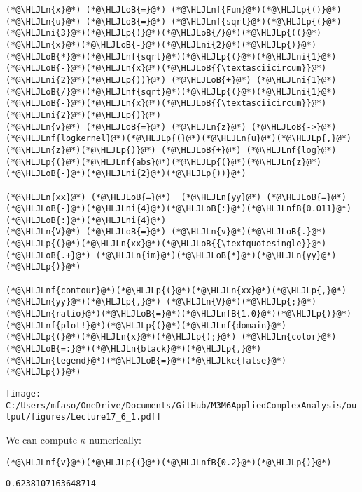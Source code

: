 \documentclass[12pt,landscape]{article}
\newcommand{\HLJLkc}[1]{\textcolor[RGB]{59,151,46}{\textit{#1}}}
\newcommand{\HLJLn}[1]{#1}
\newcommand{\HLJLnf}[1]{\textcolor[RGB]{66,102,213}{#1}}
\newcommand{\HLJLnfB}[1]{\textcolor[RGB]{59,151,46}{#1}}
\newcommand{\HLJLni}[1]{\textcolor[RGB]{59,151,46}{#1}}
\newcommand{\HLJLoB}[1]{\textcolor[RGB]{102,102,102}{\textbf{#1}}}
\newcommand{\HLJLp}[1]{#1}
\def\cent#1{\begin{center}#1\end{center} }
\begin{document}
{\begin{lstlisting}
(*@\HLJLn{x}@*) (*@\HLJLoB{=}@*) (*@\HLJLnf{Fun}@*)(*@\HLJLp{()}@*)
(*@\HLJLn{u}@*) (*@\HLJLoB{=}@*) (*@\HLJLnf{sqrt}@*)(*@\HLJLp{(}@*)(*@\HLJLni{3}@*)(*@\HLJLp{)}@*)(*@\HLJLoB{/}@*)(*@\HLJLp{((}@*)(*@\HLJLn{x}@*)(*@\HLJLoB{-}@*)(*@\HLJLni{2}@*)(*@\HLJLp{)}@*)(*@\HLJLoB{*}@*)(*@\HLJLnf{sqrt}@*)(*@\HLJLp{(}@*)(*@\HLJLni{1}@*)(*@\HLJLoB{-}@*)(*@\HLJLn{x}@*)(*@\HLJLoB{{\textasciicircum}}@*)(*@\HLJLni{2}@*)(*@\HLJLp{))}@*) (*@\HLJLoB{+}@*) (*@\HLJLni{1}@*)(*@\HLJLoB{/}@*)(*@\HLJLnf{sqrt}@*)(*@\HLJLp{(}@*)(*@\HLJLni{1}@*)(*@\HLJLoB{-}@*)(*@\HLJLn{x}@*)(*@\HLJLoB{{\textasciicircum}}@*)(*@\HLJLni{2}@*)(*@\HLJLp{)}@*)
(*@\HLJLn{v}@*) (*@\HLJLoB{=}@*) (*@\HLJLn{z}@*) (*@\HLJLoB{->}@*) (*@\HLJLnf{logkernel}@*)(*@\HLJLp{(}@*)(*@\HLJLn{u}@*)(*@\HLJLp{,}@*) (*@\HLJLn{z}@*)(*@\HLJLp{)}@*) (*@\HLJLoB{+}@*) (*@\HLJLnf{log}@*)(*@\HLJLp{(}@*)(*@\HLJLnf{abs}@*)(*@\HLJLp{(}@*)(*@\HLJLn{z}@*)(*@\HLJLoB{-}@*)(*@\HLJLni{2}@*)(*@\HLJLp{))}@*)

(*@\HLJLn{xx}@*) (*@\HLJLoB{=}@*)  (*@\HLJLn{yy}@*) (*@\HLJLoB{=}@*) (*@\HLJLoB{-}@*)(*@\HLJLni{4}@*)(*@\HLJLoB{:}@*)(*@\HLJLnfB{0.011}@*)(*@\HLJLoB{:}@*)(*@\HLJLni{4}@*)
(*@\HLJLn{V}@*) (*@\HLJLoB{=}@*) (*@\HLJLn{v}@*)(*@\HLJLoB{.}@*)(*@\HLJLp{(}@*)(*@\HLJLn{xx}@*)(*@\HLJLoB{{\textquotesingle}}@*) (*@\HLJLoB{.+}@*) (*@\HLJLn{im}@*)(*@\HLJLoB{*}@*)(*@\HLJLn{yy}@*)(*@\HLJLp{)}@*)

(*@\HLJLnf{contour}@*)(*@\HLJLp{(}@*)(*@\HLJLn{xx}@*)(*@\HLJLp{,}@*) (*@\HLJLn{yy}@*)(*@\HLJLp{,}@*) (*@\HLJLn{V}@*)(*@\HLJLp{;}@*)(*@\HLJLn{ratio}@*)(*@\HLJLoB{=}@*)(*@\HLJLnfB{1.0}@*)(*@\HLJLp{)}@*)
(*@\HLJLnf{plot!}@*)(*@\HLJLp{(}@*)(*@\HLJLnf{domain}@*)(*@\HLJLp{(}@*)(*@\HLJLn{x}@*)(*@\HLJLp{);}@*) (*@\HLJLn{color}@*)(*@\HLJLoB{=:}@*)(*@\HLJLn{black}@*)(*@\HLJLp{,}@*) (*@\HLJLn{legend}@*)(*@\HLJLoB{=}@*)(*@\HLJLkc{false}@*)(*@\HLJLp{)}@*)
\end{lstlisting}

\cent{\texttt{[image: C:/Users/mfaso/OneDrive/Documents/GitHub/M3M6AppliedComplexAnalysis/output/figures/Lecture17\_6\_1.pdf]}}

We can compute $\kappa$ numerically:


\begin{lstlisting}
(*@\HLJLnf{v}@*)(*@\HLJLp{(}@*)(*@\HLJLnfB{0.2}@*)(*@\HLJLp{)}@*)
\end{lstlisting}

\begin{lstlisting}
0.6238107163648714
\end{lstlisting}


}
\end{document}
